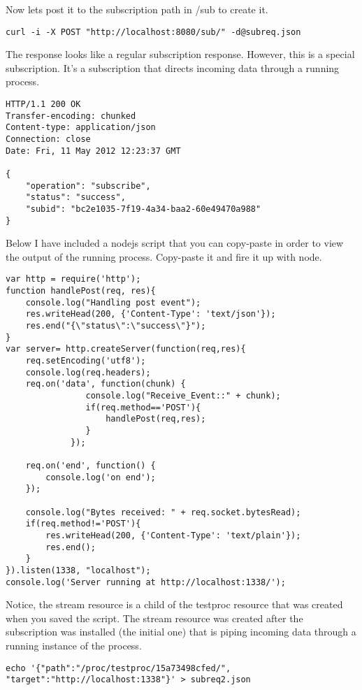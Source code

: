 Now lets post it to the subscription path in /sub to create it.

\begin{lstlisting}
curl -i -X POST "http://localhost:8080/sub/" -d@subreq.json
\end{lstlisting}

The response looks like a regular subscription response. However, this is a special subscription. It's a subscription that directs incoming data through a running process.

\begin{lstlisting}
HTTP/1.1 200 OK
Transfer-encoding: chunked
Content-type: application/json
Connection: close
Date: Fri, 11 May 2012 12:23:37 GMT

{
    "operation": "subscribe",
    "status": "success",
    "subid": "bc2e1035-7f19-4a34-baa2-60e49470a988"
}
\end{lstlisting}
Below I have included a nodejs script that you can copy-paste in order to view the output of the running process. Copy-paste it and fire it up with node.

\begin{lstlisting}
var http = require('http');
function handlePost(req, res){
    console.log("Handling post event");
    res.writeHead(200, {'Content-Type': 'text/json'});
    res.end("{\"status\":\"success\"}");
}
var server= http.createServer(function(req,res){
    req.setEncoding('utf8');
    console.log(req.headers);
    req.on('data', function(chunk) {
                console.log("Receive_Event::" + chunk);
                if(req.method=='POST'){
                    handlePost(req,res);
                }
             });

    req.on('end', function() {
        console.log('on end');
    });

    console.log("Bytes received: " + req.socket.bytesRead);
    if(req.method!='POST'){
        res.writeHead(200, {'Content-Type': 'text/plain'});
        res.end();
    }
}).listen(1338, "localhost");
console.log('Server running at http://localhost:1338/');

\end{lstlisting}


Notice, the stream resource is a child of the testproc resource that was created when you saved the script. The stream resource was created after the subscription was installed (the initial one) that is piping incoming data through a running instance of the process.

\begin{lstlisting}
echo '{"path":"/proc/testproc/15a73498cfed/", "target":"http://localhost:1338"}' > subreq2.json
\end{lstlisting}

